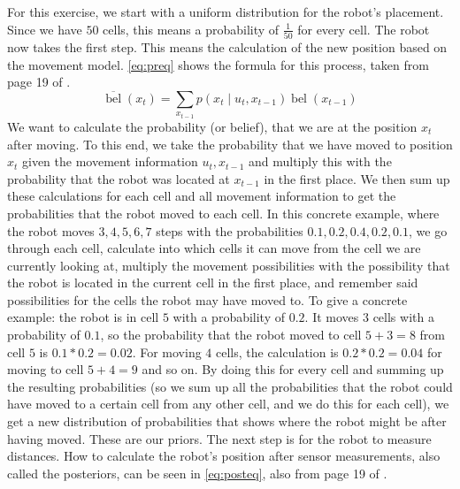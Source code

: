 \documentclass[11pt]{article}
\begin{document}
    For this exercise, we start with a uniform distribution for the robot's placement.
    Since we have $50$ cells, this means a probability of $\frac{1}{50}$ for every cell.
    The robot now takes the first step.
    This means the calculation of the new position based on the movement model.\newline
    \autoref{eq:preq} shows the formula for this process, taken from page 19 of \textcite{merz_autonome_2}.
    \begin{equation}\label{eq:preq}
    \overline{\operatorname{bel}}\left(x_{t}\right)=\sum_{x_{t-1}} p\left(x_{t} \mid u_{t}, x_{t-1}\right) \operatorname{bel}\left(x_{t-1}\right)
    \end{equation}
    We want to calculate the probability (or belief), that we are at the position $x_{t}$ after moving.
    To this end, we take the probability that we have moved to position $x_{t}$ given the movement information $u_{t},x_{t-1}$ and multiply this with the probability that the robot was located at $x_{t-1}$ in the first place.
    We then sum up these calculations for each cell and all movement information to get the probabilities that the robot moved to each cell.\newline
    In this concrete example, where the robot moves $3, 4, 5, 6, 7$ steps with the probabilities $0.1, 0.2, 0.4, 0.2, 0.1$, we go through each cell, calculate into which cells it can move from the cell we are currently looking at, multiply the movement possibilities with the possibility that the robot is located in the current cell in the first place, and remember said possibilities for the cells the robot may have moved to.
    To give a concrete example: the robot is in cell $5$ with a probability of $0.2$.
    It moves $3$ cells with a probability of $0.1$, so the probability that the robot moved to cell $5 + 3 = 8$ from cell $5$ is $0.1 * 0.2 = 0.02$.
    For moving $4$ cells, the calculation is $0.2 * 0.2 = 0.04$ for moving to cell $5 + 4 = 9$ and so on.
    By doing this for every cell and summing up the resulting probabilities (so we sum up all the probabilities that the robot could have moved to a certain cell from any other cell, and we do this for each cell), we get a new distribution of probabilities that shows where the robot might be after having moved.
    These are our priors.
    The next step is for the robot to measure distances.\newline
    How to calculate the robot's position after sensor measurements, also called the posteriors, can be seen in \autoref{eq:posteq}, also from page 19 of \textcite{merz_autonome_2}.
\end{document}
